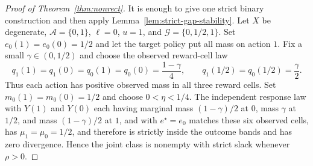 \documentclass[11pt]{article}
\theoremstyle{definition}
\theoremstyle{plain}
\theoremstyle{remark}
\begin{document}
\begin{proof}[Proof of Theorem~\ref{thm:nonrect}]
It is enough to give one strict binary construction and then apply
Lemma~\ref{lem:strict-gap-stability}.  Let $X$ be degenerate,
$\mathcal A=\{0,1\}$, $\ell=0$, $u=1$, and
$\mathcal G=\{0,1/2,1\}$.  Set
$e_0(1)=e_0(0)=1/2$ and let the target policy put all mass on action $1$.
Fix a small $\gamma\in(0,1/2)$ and choose the observed reward-cell law
\[
  q_1(1)=q_1(0)=q_0(1)=q_0(0)=\frac{1-\gamma}{4},
  \qquad q_1(1/2)=q_0(1/2)=\frac{\gamma}{2}.
\]
Thus each action has positive observed mass in all three reward cells.  Set
$m_0(1)=m_0(0)=1/2$ and choose $0<\eta<1/4$.  The independent response law with
$Y(1)$ and $Y(0)$ each having marginal mass $(1-\gamma)/2$ at $0$, mass
$\gamma$ at $1/2$, and mass $(1-\gamma)/2$ at $1$, and with
$e^\star=e_0$ matches these six observed cells, has
$\mu_1=\mu_0=1/2$, and therefore is strictly inside the outcome bands and has
zero divergence.  Hence the joint class is nonempty with strict slack whenever
$\rho>0$.


\end{proof}
\end{document}
